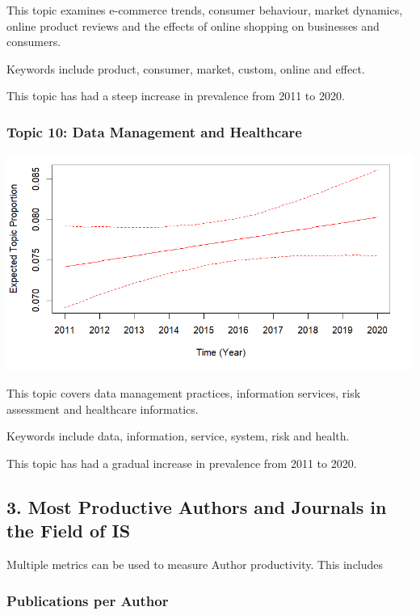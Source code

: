 \documentclass[
  letterpaper,
  DIV=11,
  numbers=noendperiod]{scrartcl}
\begin{document}
This topic examines e-commerce trends, consumer behaviour, market
dynamics, online product reviews and the effects of online shopping on
businesses and consumers.

Keywords include product, consumer, market, custom, online and effect.

This topic has had a steep increase in prevalence from 2011 to 2020.

\hypertarget{topic-10-data-management-and-healthcare}{%
\subsubsection{Topic 10: Data Management and
Healthcare}\label{topic-10-data-management-and-healthcare}}

\includegraphics{images/topic10.png}

This topic covers data management practices, information services, risk
assessment and healthcare informatics.

Keywords include data, information, service, system, risk and health. ~

This topic has had a gradual increase in prevalence from 2011 to 2020.

\newpage{}

\hypertarget{most-productive-authors-and-journals-in-the-field-of-is}{%
\subsection{\texorpdfstring{\textbf{3. Most Productive Authors and
Journals in the Field of
IS}}{3. Most Productive Authors and Journals in the Field of IS}}\label{most-productive-authors-and-journals-in-the-field-of-is}}

Multiple metrics can be used to measure Author productivity. This
includes

\hypertarget{publications-per-author}{%
\subsubsection{Publications per Author}\label{publications-per-author}}
\end{document}
